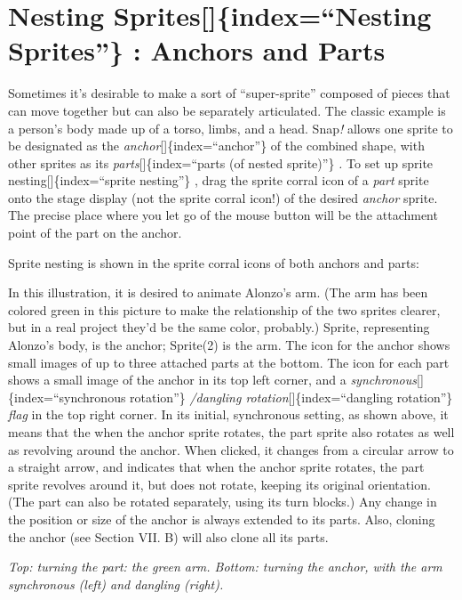 \documentclass[
  letterpaper,
]{book}
\begin{document}
\section{Nesting Sprites{[}{]}\{index=``Nesting Sprites''\} : Anchors
and Parts}\label{nesting-spritesindexnesting-sprites-anchors-and-parts}

Sometimes it's desirable to make a sort of ``super-sprite'' composed of
pieces that can move together but can also be separately articulated.
The classic example is a person's body made up of a torso, limbs, and a
head. Snap\emph{!} allows one sprite to be designated as the
\emph{anchor}{[}{]}\{index=``anchor''\} of the combined shape, with
other sprites as its \emph{parts}{[}{]}\{index=``parts (of nested
sprite)''\} \emph{.} To set up sprite nesting{[}{]}\{index=``sprite
nesting''\} , drag the sprite corral icon of a \emph{part} sprite onto
the stage display (not the sprite corral icon!) of the desired
\emph{anchor} sprite. The precise place where you let go of the mouse
button will be the attachment point of the part on the anchor.

Sprite nesting is shown in the sprite corral icons of both anchors and
parts:

In this illustration, it is desired to animate Alonzo's arm. (The arm
has been colored green in this picture to make the relationship of the
two sprites clearer, but in a real project they'd be the same color,
probably.) Sprite, representing Alonzo's body, is the anchor; Sprite(2)
is the arm. The icon for the anchor shows small images of up to three
attached parts at the bottom. The icon for each part shows a small image
of the anchor in its top left corner, and a
\emph{synchronous}{[}{]}\{index=``synchronous rotation''\}
\emph{/dangling rotation}{[}{]}\{index=``dangling rotation''\}
\emph{flag} in the top right corner. In its initial, synchronous
setting, as shown above, it means that the when the anchor sprite
rotates, the part sprite also rotates as well as revolving around the
anchor. When clicked, it changes from a circular arrow to a straight
arrow, and indicates that when the anchor sprite rotates, the part
sprite revolves around it, but does not rotate, keeping its original
orientation. (The part can also be rotated separately, using its turn
blocks.) Any change in the position or size of the anchor is always
extended to its parts. Also, cloning the anchor (see Section VII. B)
will also clone all its parts.

\emph{Top: turning the part: the green arm. Bottom: turning the anchor,
with the arm synchronous (left) and dangling (right).}
\end{document}
